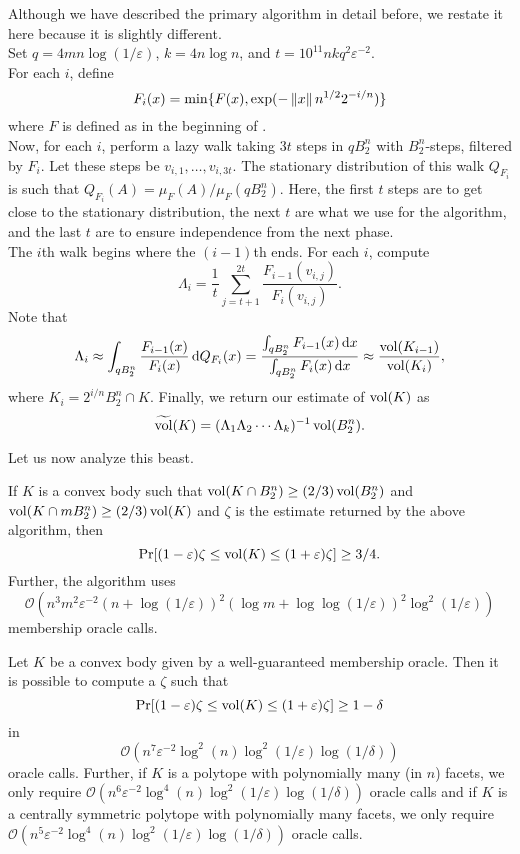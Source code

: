 Although we have described the primary algorithm in detail before, we restate it here because it is slightly different.\\
Set $q=4mn\log(1/\varepsilon)$, $k=4n\log n$, and $t=10^{11}nkq^2\varepsilon^{-2}$.\\
For each $i$, define
\[ F_i(x) = \min\{F(x), \exp(-\left\lVert x\right\rVert n^{1/2}2^{-i/n})\} \]
where $F$ is defined as in the beginning of .\\
Now, for each $i$, perform a lazy walk taking $3t$ steps in $qB_2^n$ with $B_2^n$-steps, filtered by $F_i$. Let these steps be $v_{i,1},\ldots,v_{i,3t}$. The stationary distribution of this walk $Q_{F_i}$ is such that $Q_{F_i}(A) = \mu_F(A)/\mu_F(qB_2^n)$. Here, the first $t$ steps are to get close to the stationary distribution, the next $t$ are what we use for the algorithm, and the last $t$ are to ensure independence from the next phase. \\
The $i$th walk begins where the $(i-1)$th ends. For each $i$, compute
\[ \Lambda_i = \frac{1}{t} \sum_{j=t+1}^{2t} \frac{F_{i-1}(v_{i,j})}{F_i(v_{i,j})}. \]
Note that
\[ \Lambda_i \approx \int_{qB_2^n} \frac{F_{i-1}(x)}{F_i(x)} \operatorname{d}\!{Q}_{F_i}(x) = \frac{\int_{qB_2^n} F_{i-1}(x) \operatorname{d}\!{x}}{\int_{qB_2^n} F_i(x) \operatorname{d}\!{x}} \approx \frac{\operatorname{vol}(K_{i-1})}{\operatorname{vol}(K_i)}, \]
where $K_i = 2^{i/n} B_2^n \cap K$. Finally, we return our estimate of $\operatorname{vol}(K)$ as
\[ \widetilde{\operatorname{vol}}(K) = (\Lambda_1\Lambda_2\cdots\Lambda_k)^{-1} \operatorname{vol}(B_2^n). \]

Let us now analyze this beast.

\begin{ftheo}
	If $K$ is a convex body such that $\operatorname{vol}(K\cap B_2^n) \geq (2/3) \operatorname{vol}(B_2^n)$ and $\operatorname{vol}(K\cap mB_2^n) \geq (2/3) \operatorname{vol}(K)$ and $\zeta$ is the estimate returned by the above algorithm, then
	\[ \Pr[(1-\varepsilon)\zeta \leq \operatorname{vol}(K) \leq (1+\varepsilon)\zeta] \geq 3/4. \]
	Further, the algorithm uses
	\[ \mathcal{O}\left(n^3m^2\varepsilon^{-2} (n+\log(1/\varepsilon))^2 (\log m + \log\log(1/\varepsilon))^2 \log^2(1/\varepsilon) \right) \]
	membership oracle calls.
\end{ftheo}

\begin{corollary}
	Let $K$ be a convex body given by a well-guaranteed membership oracle. Then it is possible to compute a $\zeta$ such that
	\[ \Pr[(1-\varepsilon)\zeta \leq \operatorname{vol}(K) \leq (1+\varepsilon)\zeta] \geq 1-\delta \]
	in
	\[ \mathcal{O}\left(n^7 \varepsilon^{-2} \log^2 (n) \log^2(1/\varepsilon) \log(1/\delta) \right) \]
	oracle calls. Further, if $K$ is a polytope with polynomially many (in $n$) facets, we only require $\mathcal{O}\left(n^6 \varepsilon^{-2} \log^4 (n) \log^2(1/\varepsilon) \log(1/\delta) \right)$	oracle calls and if $K$ is a centrally symmetric polytope with polynomially many facets, we only require $\mathcal{O}\left(n^5 \varepsilon^{-2} \log^4 (n) \log^2(1/\varepsilon) \log(1/\delta) \right)$ oracle calls.
\end{corollary}

